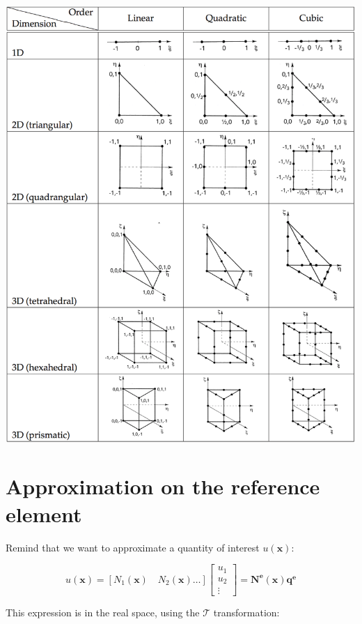 	\ \\
	\begin{center}
	\includegraphics[scale=0.3]{ch6/7}
	\label{ch6/7}
	\end{center}
	
\section{Approximation on the reference element}
	Remind that we want to approximate a quantity of interest $u(\bm{x})$: 
	
	\begin{equation}
	u(\bm{x}) = [N_1(\bm{x}) \quad N_2(\bm{x}) \dots] \left[
	\begin{array}{c}
	u_1\\
	u_2\\
	\vdots
	\end{array}
	\right] = \bm{N^e(x)q^e}
	\end{equation}
	
	This expression is in the real space, using the $\mathcal{T}$ transformation:
	
